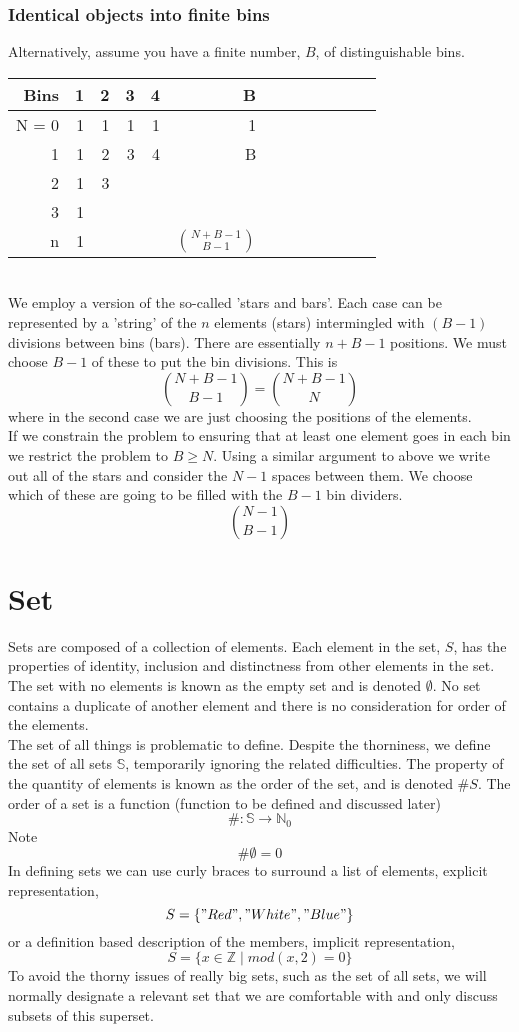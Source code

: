 \documentclass[a4paper]{scrartcl}
\begin{document}
\subsubsection{Identical objects into finite bins}
Alternatively, assume you have a finite number, $B$, of distinguishable bins.\\ 
\begin{tabular}
{| r | r | r | r | r |r | c | c | c | c | c | c | c | } \hline
Bins & 1 & 2 & 3 & 4 & B  \\ \hline
N = 0 & 1 & 1 & 1 & 1 & 1   \\ \hline
1 & 1 & 2 & 3 & 4 & B   \\ \hline
2 & 1 & 3 & & &   \\ \hline
3 & 1 & & & &  \\ \hline
n & 1 & & & &  ${N+B-1 \choose B-1}$  \\ \hline
\end{tabular} \\
We employ a version of the so-called 'stars and bars'. Each case can be represented by a 'string' of the $n$ elements (stars) intermingled with $(B-1)$ divisions between bins (bars). There are essentially $n+B-1$ positions. We must choose $B-1$ of these to put the bin divisions. This is 
$${N+B-1 \choose B-1} = {N+B-1 \choose N}$$
where in the second case we are just choosing the positions of the elements. \\ If we constrain the problem to ensuring that at least one element goes in each bin we restrict the problem to $B\geq N$. Using a similar argument to above we write out all of the stars and consider the $N-1$ spaces between them. We choose which of these are going to be filled with the $B-1$ bin dividers.
$${N-1 \choose B-1}$$
  
\section{Set}
Sets are composed of a collection of elements. Each element in the set, $S$, has the properties of identity,  inclusion and distinctness from other elements in the set. 
The set with no elements is known as the empty set and is denoted $\emptyset$. No set contains a duplicate of another element and there is no consideration for order of the elements.\\
The set of all things is problematic to define. Despite the thorniness, we define the set of all sets $\mathbb{S}$, temporarily ignoring the related difficulties. The property of the quantity of elements is known as the order of the set, and is denoted $\#S$. The order of a set is a function (function to be defined and discussed later)
$$\# : \mathbb{S}\rightarrow \mathbb{N}_{0}$$
Note
$$\#\emptyset = 0$$
In defining sets we can use curly braces to surround a list of elements, explicit representation,
$$ S = \{ "Red", "White", "Blue"\} $$
or a definition based description of the members, implicit representation,
$$ S = \{ x\in\mathbb{Z} \mid mod(x,2) = 0\} $$
To avoid the thorny issues of really big sets, such as the set of all sets, we will normally designate a relevant set that we are comfortable with and only discuss subsets of this superset.  
\end{document}
